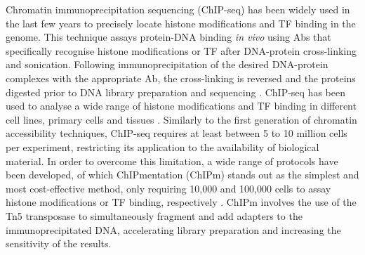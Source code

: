 Chromatin immunoprecipitation sequencing (ChIP-seq) has been widely used in the last few years to precisely locate histone modifications and TF binding in the genome. This technique assays protein-DNA binding \textit{in vivo} using Abs that specifically recognise histone modifications or TF after DNA-protein cross-linking and sonication. Following immunoprecipitation of the desired DNA-protein complexes with the appropriate Ab, the cross-linking is reversed and the proteins digested prior to DNA library preparation and sequencing \parencite{Solomon1988,Barski2007,Johnson2007}. ChIP-seq has been used to analyse a wide range of histone modifications and TF binding in different cell lines, primary cells and tissues \parencite{ENCODE2012,Bernstein2010,Adams2012}. Similarly to the first generation of chromatin accessibility techniques, ChIP-seq requires at least between 5 to 10 million cells per experiment, restricting its application to the availability of biological material. In order to overcome this limitation, a wide range of protocols have been developed, of which ChIPmentation (ChIPm) stands out as the simplest and most cost-effective method, only requiring 10,000 and 100,000 cells to assay histone modifications or TF binding, respectively \parencite{Schmidl2015}. ChIPm involves the use of the Tn5 transposase to simultaneously fragment and add adapters to the immunoprecipitated DNA, accelerating library preparation and increasing the sensitivity of the results. 


